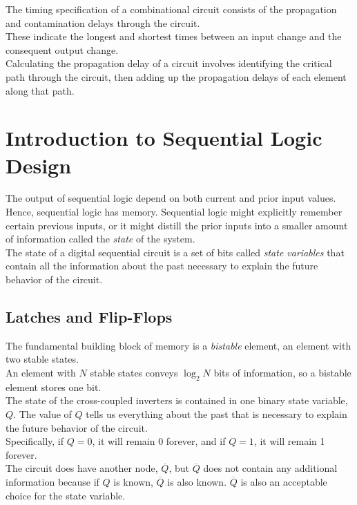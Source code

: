 \documentclass[12pt]{article}
\theoremstyle{definition}
\begin{document}
  The timing specification of a combinational circuit consists of the propagation and contamination delays through the circuit. \\
  These indicate the longest and shortest times between an input change and the consequent output change. \\
  Calculating the propagation delay of a circuit involves identifying the critical path through the circuit, then adding up the propagation delays of each element along that path.

  \newpage
  \section{Introduction to Sequential Logic Design}
  The output of sequential logic depend on both current and prior input values. \\
  Hence, sequential logic has memory.
  Sequential logic might explicitly remember certain previous inputs, or it might distill the prior inputs into a smaller amount of information called the \emph {state} of the system. \\
  The state of a digital sequential circuit is a set of bits called \emph{state variables} that contain all the information about the past necessary to explain the future behavior of the circuit.

  \subsection{Latches and Flip-Flops}
  The fundamental building block of memory is a \emph{bistable} element, an element with two stable states. \\
  An element with $N$ stable states conveys $\log_{2}N$ bits of information, so a bistable element stores one bit. \\
  The state of the cross-coupled inverters is contained in one binary state variable, $Q$.
  The value of $Q$ tells us everything about the past that is necessary to explain the future behavior of the circuit. \\
  Specifically, if $Q = 0$, it will remain 0 forever, and if $Q = 1$, it will remain 1 forever. \\
  The circuit does have another node, $\overline{Q}$, but $\overline{Q}$ does not contain any additional information because if $Q$ is known, $\overline{Q}$ is also known.
  $\overline{Q}$ is also an acceptable choice for the state variable. \\
\end{document}
